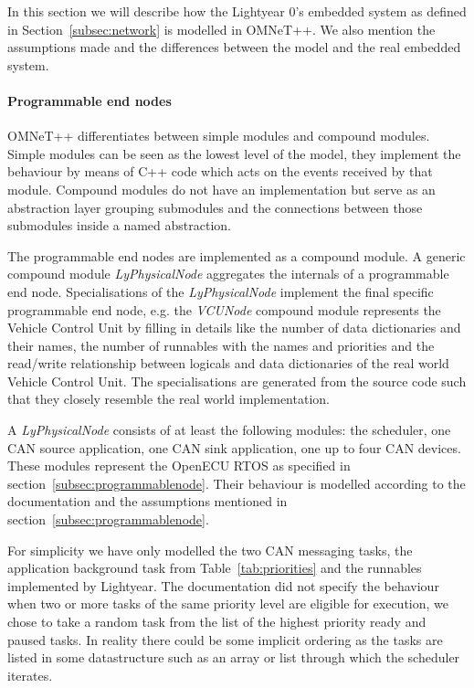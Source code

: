 In this section we will describe how the Lightyear 0's embedded system as defined in Section~\ref{subsec:network} is modelled in OMNeT++. We also mention the assumptions made and the differences between the model and the real embedded system.

\paragraph{Programmable end nodes} OMNeT++ differentiates between simple modules and compound modules. Simple modules can be seen as the lowest level of the model, they implement the behaviour by means of C++ code which acts on the events received by that module. Compound modules do not have an implementation but serve as an abstraction layer grouping submodules and the connections between those submodules inside a named abstraction.

The programmable end nodes are implemented as a compound module. A generic compound module \textit{LyPhysicalNode} aggregates the internals of a programmable end node. Specialisations of the \textit{LyPhysicalNode} implement the final specific programmable end node, e.g. the \textit{VCUNode} compound module represents the Vehicle Control Unit by filling in details like the number of data dictionaries and their names, the number of runnables with the names and priorities and the read/write relationship between logicals and data dictionaries of the real world Vehicle Control Unit. The specialisations are generated from the source code such that they closely resemble the real world implementation. 

A \textit{LyPhysicalNode} consists of at least the following modules: the scheduler, one CAN source application, one CAN sink application, one up to four CAN devices. These modules represent the OpenECU RTOS as specified in section~\ref{subsec:programmablenode}. Their behaviour is modelled according to the documentation and the assumptions mentioned in section~\ref{subsec:programmablenode}. 

For simplicity we have only modelled the two CAN messaging tasks, the application background task from Table~\ref{tab:priorities} and the runnables implemented by Lightyear. The documentation did not specify the behaviour when two or more tasks of the same priority level are eligible for execution, we chose to take a random task from the list of the highest priority ready and paused tasks. In reality there could be some implicit ordering as the tasks are listed in some datastructure such as an array or list through which the scheduler iterates. 

